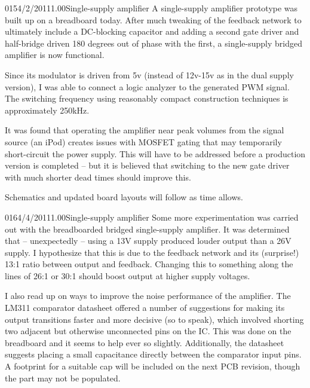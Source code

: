 \documentclass[12pt,letterpaper,onecolumn]{article}
\begin{document}
\begin{nbentry}{015}{4/2/2011}{1.00}{Single-supply amplifier}
A single-supply amplifier prototype was built up on a breadboard today.  After much tweaking of the feedback network to ultimately include a DC-blocking capacitor and adding a second gate driver and half-bridge driven 180 degrees out of phase with the first, a single-supply bridged amplifier is now functional.

Since its modulator is driven from 5v (instead of 12v-15v as in the dual supply version), I was able to connect a logic analyzer to the generated PWM signal.  The switching frequency using reasonably compact construction techniques is approximately 250kHz.

It was found that operating the amplifier near peak volumes from the signal source (an iPod) creates issues with MOSFET gating that may temporarily short-circuit the power supply.  This will have to be addressed before a production version is completed -- but it is believed that switching to the new gate driver with much shorter dead times should improve this.

Schematics and updated board layouts will follow as time allows.
\end{nbentry}

\begin{nbentry}{016}{4/4/2011}{1.00}{Single-supply amplifier}
Some more experimentation was carried out with the breadboarded bridged single-supply amplifier.  It was determined that -- unexpectedly -- using a 13V supply produced louder output than a 26V supply.  I hypothesize that this is due to the feedback network and its (surprise!) 13:1 ratio between output and feedback.  Changing this to something along the lines of 26:1 or 30:1 should boost output at higher supply voltages.

I also read up on ways to improve the noise performance of the amplifier.  The LM311 comparator datasheet offered a number of suggestions for making its output transitions faster and more decisive (so to speak), which involved shorting two adjacent but otherwise unconnected pins on the IC.  This was done on the breadboard and it seems to help ever so slightly.  Additionally, the datasheet suggests placing a small capacitance directly between the comparator input pins.  A footprint for a suitable cap will be included on the next PCB revision, though the part may not be populated.
\end{nbentry}
\end{document}
